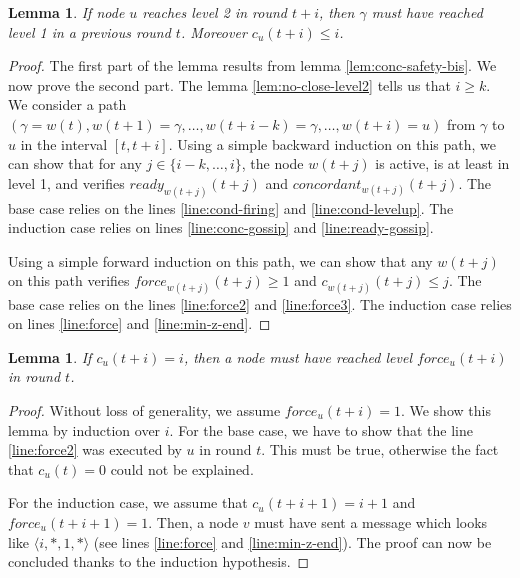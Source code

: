 \documentclass[11pt,letterpaper]{article}
\renewcommand{\leq}{\leqslant}
\renewcommand{\geq}{\geqslant}
\newtheorem{lem}[thm]{Lemma}
\newcommand{\cent}{\gamma}
\begin{document}
\begin{lem} \label{lem:ready-safety}
	If node $u$ reaches level 2 in round $t+i$, then $\cent$ must have reached level 1 in a previous round $t$. Moreover $c_u(t+i) \leq i$.
\end{lem}
\begin{proof}
	The first part of the lemma results from lemma \ref{lem:conc-safety-bis}. We now prove the second part.
	The lemma \ref{lem:no-close-level2} tells us that $i \geq k$.
	We consider a path $(\cent = w(t), w(t+1) = \cent, \dots, w(t+i-k) = \cent, \dots, w(t+i) = u)$ from $\cent$ to $u$ in the interval $[t, t+i]$. 
	Using a simple backward induction on this path, we can show that for any $j \in \{i-k, \dots, i\}$,
	the node $w(t+j)$ is active, is at least in level 1, and verifies $ready_{w(t+j)}(t+j)$ and $concordant_{w(t+j)}(t+j)$.
	The base case relies on the lines \ref{line:cond-firing} and \ref{line:cond-levelup}. The induction case relies on lines \ref{line:conc-gossip} and \ref{line:ready-gossip}.

	Using a simple forward induction on this path, we can show that any $w(t+j)$ on this path verifies $force_{w(t+j)}(t+j) \geq 1$ and $c_{w(t+j)}(t+j) \leq j$.
	The base case relies on the lines \ref{line:force2} and \ref{line:force3}. The induction case relies on lines \ref{line:force} and \ref{line:min-z-end}.
\end{proof}

\begin{lem} \label{lem:safety-force}
	If $c_u(t+i) = i$, then a node must have reached level $force_u(t+i)$ in round $t$.
\end{lem}
\begin{proof}
	Without loss of generality, we assume $force_u(t+i) = 1$.
	We show this lemma by induction over $i$.
	For the base case, we have to show that the line \ref{line:force2} was executed by $u$ in round $t$.
	This must be true, otherwise the fact that $c_u(t) = 0$ could not be explained.

	For the induction case, we assume that $c_u(t+i+1) = i+1$ and $force_u(t+i+1) = 1$.
	Then, a node $v$ must have sent a message which looks like $\langle i, *, 1, * \rangle$ (see lines \ref{line:force} and \ref{line:min-z-end}).
	The proof can now be concluded thanks to the induction hypothesis.
\end{proof}
\end{document}
